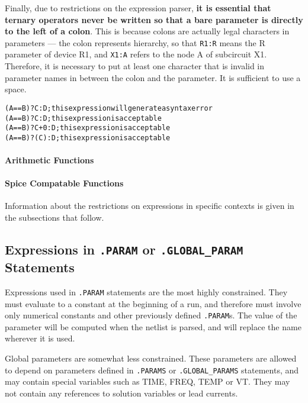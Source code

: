 Finally, due to restrictions on the expression parser, {\bf it is essential
that ternary operators never be written so that a bare parameter is
directly to the left of a colon}.  This is because colons are actually
legal characters in parameters --- the colon represents hierarchy, so
that \texttt{R1:R} means the R parameter of device R1, and
\texttt{X1:A} refers to the node A of subcircuit X1.  Therefore, it is
necessary to put at least one character that is invalid in parameter names
in between the colon and the parameter.  It is sufficient to use a space.
\begin{alltt}
    {\color{red} (A==B)?C:D}  ; this expression will generate a syntax error
    {(A==B)?C :D}  ; this expression is acceptable
    {(A==B)?C+0:D}  ; this expression is acceptable
    {(A==B)?(C):D}  ; this expression is acceptable
\end{alltt}

\paragraph{Arithmetic Functions}


\paragraph{Spice Compatable Functions}


Information about the restrictions on expressions in specific contexts
is given in the subsections that follow.

\subsection{Expressions in \texttt{.PARAM} or \texttt{.GLOBAL\_PARAM} Statements}

Expressions used in \texttt{.PARAM} statements are the most highly
constrained.  They must evaluate to a constant at the beginning of a
run, and therefore must involve only numerical constants and other
previously defined \texttt{.PARAM}s.  The value of the parameter will
be computed when the netlist is parsed, and will replace the name
wherever it is used.


Global parameters are somewhat less constrained.  These parameters are
allowed to depend on parameters defined in \texttt{.PARAMS} or
\texttt{.GLOBAL\_PARAMS} statements, and may contain special variables
such as \textrm{TIME}, \textrm{FREQ}, \textrm{TEMP} or \textrm{VT}.  They
may not contain any references to solution variables or lead currents.

